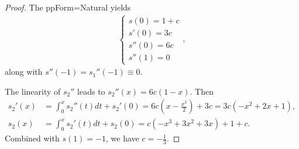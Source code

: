 \documentclass{article}
\newcommand{\RNum}[1]{\uppercase\expandafter{\romannumeral #1\relax}}
\begin{document}
\RNum{3}
\begin{proof}
 The ppForm=Natural yields
  \begin{align*}
    \left\{\begin{array}{l}s(0)=1+c\\s'(0)=3c\\s''(0)=6c\\s''(1)=0\end{array}\right. ,
  \end{align*}
  along with $s''(-1)=s_1''(-1)\equiv 0$.

  The linearity of $s_2''$ leads to $s_2''(x)=6c(1-x)$. Then
  \begin{align*}
    s_2'(x)&=\int_0^xs_2''(t)dt +s_2'(0)=6c(x-\frac{x^2}{2})+3c=3c(-x^2+2x+1),\\
    s_2(x)&=\int_0^xs_2'(t)dt+s_2(0)=c(-x^3+3x^2+3x)+1+c.
  \end{align*}
   Combined with $s(1)=-1$, we have $c=-\frac{1}{3}$.
\end{proof}
\end{document}
